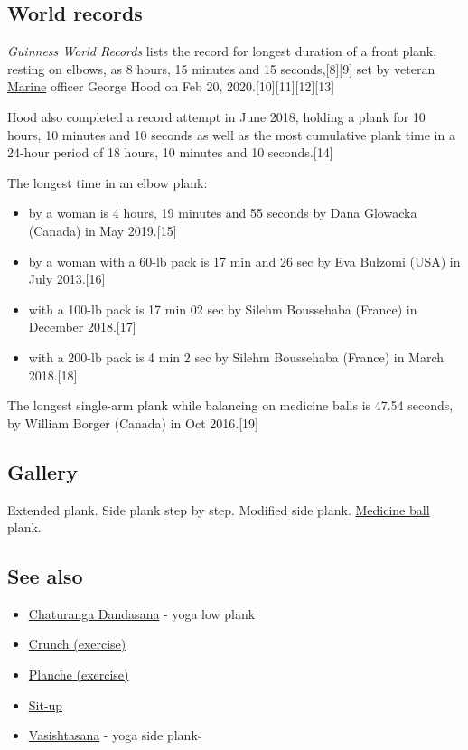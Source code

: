 \documentclass[oneside]{book}
\numberwithin{equation}{section}
\begin{document}
\subsection{World records}
\textit{Guinness World Records} lists the record for longest duration of a front plank, resting on elbows, as 8 hours, 15 minutes and 15 seconds,[8][9] set by veteran \href{https://en.wikipedia.org/wiki/United_States_Marine_Corps}{Marine} officer George Hood on Feb 20, 2020.[10][11][12][13]

Hood also completed a record attempt in June 2018, holding a plank for 10 hours, 10 minutes and 10 seconds as well as the most cumulative plank time in a 24-hour period of 18 hours, 10 minutes and 10 seconds.[14]

%
The longest time in an elbow plank:
\begin{itemize}
    \item by a woman is 4 hours, 19 minutes and 55 seconds by Dana Glowacka (Canada) in May 2019.[15]
    \item by a woman with a 60-lb pack is 17 min and 26 sec by Eva Bulzomi (USA) in July 2013.[16]
    \item with a 100-lb pack is 17 min 02 sec by Silehm Boussehaba (France) in December 2018.[17]
    \item with a 200-lb pack is 4 min 2 sec by Silehm Boussehaba (France) in March 2018.[18]
\end{itemize}
The longest single-arm plank while balancing on medicine balls is 47.54 seconds, by William Borger (Canada) in Oct 2016.[19]

\subsection{Gallery}
\textsf{Extended plank. Side plank step by step. Modified side plank. \href{https://en.wikipedia.org/wiki/Medicine_ball}{Medicine ball} plank.}

\subsection{See also}
\begin{itemize}
    \item \href{https://en.wikipedia.org/wiki/Chaturanga_Dandasana}{Chaturanga Dandasana} - yoga low plank
    \item \href{https://en.wikipedia.org/wiki/Crunch_(exercise)}{Crunch (exercise)}
    \item \href{https://en.wikipedia.org/wiki/Planche_(exercise)}{Planche (exercise)}
    \item \href{https://en.wikipedia.org/wiki/Sit-up}{Sit-up}
    \item \href{https://en.wikipedia.org/wiki/Vasishtasana}{Vasishtasana} - yoga side plank\hfill$\square$
\end{itemize}
\end{document}
